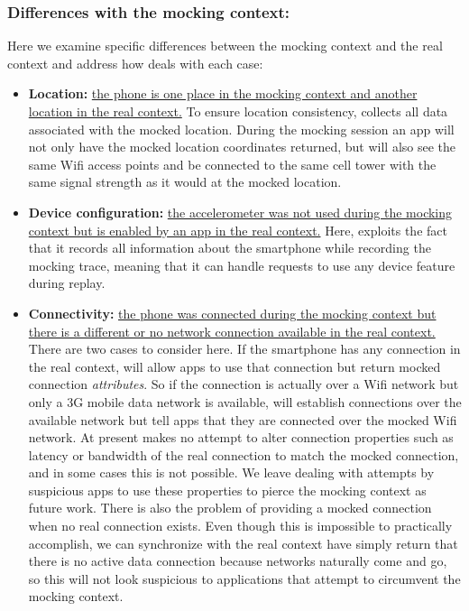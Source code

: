 \subsubsection{Differences with the mocking context:\space}

Here we examine specific differences between the mocking context and the real
context and address how \PocketMocker{} deals with each case:

\begin{itemize}

\item \textbf{Location:} \uline{the phone is one place in the mocking context
and another location in the real context.} To ensure location consistency,
\PocketMocker{} collects all data associated with the mocked location. During
the mocking session an app will not only have the mocked location coordinates
returned, but will also see the same Wifi access points and be connected to
the same cell tower with the same signal strength as it would at the mocked
location.

\item \textbf{Device configuration:} \uline{the accelerometer was not used
during the mocking context but is enabled by an app in the real context.}
Here, \PocketMocker{} exploits the fact that it records all information about
the smartphone while recording the mocking trace, meaning that it can handle
requests to use any device feature during replay.

\item \textbf{Connectivity:} \uline{the phone was connected during the
mocking context but there is a different or no network connection available
in the real context.} There are two cases to consider here. If the smartphone
has any connection in the real context, \PocketMocker{} will allow apps to
use that connection but return mocked connection \textit{attributes}. So if
the connection is actually over a Wifi network but only a 3G mobile data
network is available, \PocketMocker{} will establish connections over the
available network but tell apps that they are connected over the mocked Wifi
network. At present \PocketMocker{} makes no attempt to alter connection
properties such as latency or bandwidth of the real connection to match the
mocked connection, and in some cases this is not possible. We leave dealing
with attempts by suspicious apps to use these properties to pierce the mocking
context as future work. There is also the problem of providing a mocked
connection when no real connection exists. Even though this is impossible to
practically accomplish, we can synchronize with the real context have
\PocketMocker{} simply return that there is no active data connection because
networks naturally come and go, so this will not look suspicious to
applications that attempt to circumvent the mocking context.

\end{itemize}

